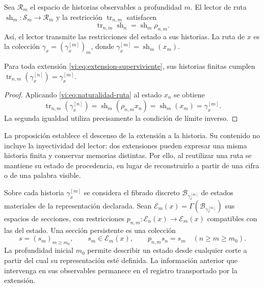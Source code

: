Sea $\mathcal R_m$ el espacio de historias observables a profundidad $m$.
El lector de ruta $\operatorname{sh}_m:\mathcal S_m\to\mathcal R_m$
y la restricción $\operatorname{tr}_{n,m}$ satisfacen
\begin{equation}
 \operatorname{tr}_{n,m}\operatorname{sh}_n
 =\operatorname{sh}_m\rho_{n,m}.
 \label{vi:eq:naturalidad-ruta}
\end{equation}
Así, el lector transmite las restricciones del estado a sus historias.
La ruta de $x$ es la colección
$\gamma_x=(\gamma_x^{[m]})_m$, donde
$\gamma_x^{[m]}=\operatorname{sh}_m(x_m)$.

\begin{proposition}
\label{vi:prop:historia-compatible}
Para toda extensión \eqref{vi:eq:extension-superviviente}, sus historias
finitas cumplen
$\operatorname{tr}_{n,m}(\gamma_x^{[n]})=\gamma_x^{[m]}$.
\end{proposition}
\begin{proof}
Aplicando \eqref{vi:eq:naturalidad-ruta} al estado $x_n$ se obtiene
\[
 \operatorname{tr}_{n,m}(\gamma_x^{[n]})
 =\operatorname{sh}_m(\rho_{n,m}x_n)
 =\operatorname{sh}_m(x_m)=\gamma_x^{[m]}.
\]
La segunda igualdad utiliza precisamente la condición de límite inverso.
\end{proof}

La proposición establece el descenso de la extensión a la historia.
Su contenido no incluye la inyectividad del lector: dos extensiones
pueden expresar una misma historia finita y conservar memorias distintas.
Por ello, al reutilizar una ruta se mantiene su estado de procedencia,
en lugar de reconstruirlo a partir de una cifra o de una palabra visible.

Sobre cada historia $\gamma_x^{[m]}$ se considera el fibrado discreto
$\mathcal B_{\gamma_x^{[m]}}$ de estados materiales de la representación
declarada. Sean
$\mathscr E_m(x)=\Gamma(\mathcal B_{\gamma_x^{[m]}})$ sus espacios
de secciones, con restricciones
$p_{n,m}:\mathscr E_n(x)\to\mathscr E_m(x)$ compatibles con las
del estado. Una sección persistente es una colección
\begin{equation}
 s=(s_m)_{m\geq m_0},\qquad s_m\in\mathscr E_m(x),\qquad
 p_{n,m}s_n=s_m\quad(n\geq m\geq m_0).
 \label{vi:eq:seccion-persistente}
\end{equation}
La profundidad inicial $m_0$ permite describir un estado desde cualquier
corte a partir del cual su representación esté definida. La información
anterior que intervenga en sus observables permanece en el registro
transportado por la extensión.

